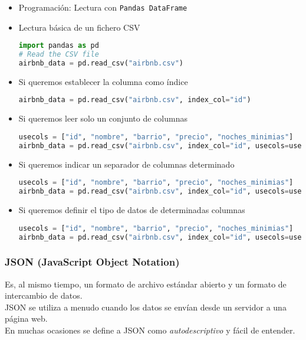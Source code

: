\begin{itemize}[label=\color{red}\textbullet, leftmargin=*]
	\item \color{lightblue}Programación: Lectura con \texttt{Pandas DataFrame}
\end{itemize}
\begin{itemize}
	\item Lectura básica de un fichero CSV
	\begin{lstlisting}[language=python]
import pandas as pd
# Read the CSV file
airbnb_data = pd.read_csv("airbnb.csv")
	\end{lstlisting}
	\item Si queremos establecer la columna  como índice
	\begin{lstlisting}[language=python]
airbnb_data = pd.read_csv("airbnb.csv", index_col="id")
	\end{lstlisting}
	\item Si queremos leer solo un conjunto de columnas
	\begin{lstlisting}[language=python]
usecols = ["id", "nombre", "barrio", "precio", "noches_minimias"]
airbnb_data = pd.read_csv("airbnb.csv", index_col="id", usecols=usecols)
	\end{lstlisting}
	\item Si queremos indicar un separador de columnas determinado
	\begin{lstlisting}[language=python]
usecols = ["id", "nombre", "barrio", "precio", "noches_minimias"]
airbnb_data = pd.read_csv("airbnb.csv", index_col="id", usecols=usecols, sep="|")
	\end{lstlisting}
	\item Si queremos definir el tipo de datos de determinadas columnas
	\begin{lstlisting}[language=python]
usecols = ["id", "nombre", "barrio", "precio", "noches_minimias"]
airbnb_data = pd.read_csv("airbnb.csv", index_col="id", usecols=usecols, sep="|", dtype:{'precio': float, 'barrio':str, 'noches_minimas':int}, decimal=',')
	\end{lstlisting}
\end{itemize}
\subsubsection{JSON (JavaScript Object Notation)}
Es, al mismo tiempo, un formato de archivo estándar abierto y un formato de intercambio de datos.\\
JSON se utiliza a menudo cuando los datos se envían desde un servidor a una página web.\\
En muchas ocasiones se define a JSON como \textit{autodescriptivo} y fácil de entender.

